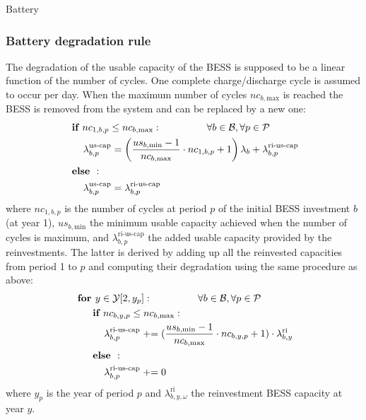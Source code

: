 \begin{frame}[allowframebreaks]{Battery}
\subsubsection{Battery degradation rule}
The degradation of the usable capacity of the BESS is supposed to be a linear function of the number of cycles. 
One complete charge/discharge cycle is assumed to occur per day. When the maximum number of cycles $nc_{b,\text{max}}$ is reached the BESS is removed from the system and can be replaced by a new one:
\begin{align}
 &\textbf{~if~} nc_{1, b, p} \leq nc_{b,\text{max}}: \textbf{~~~~~~~~~~~~}\forall  b \in \mathcal{B}, \forall  p \in \mathcal{P} \notag\\
     &\textbf{~~~~}\lambda^\text{us-cap}_{b,p} = \left(\frac{us_{b,\text{min}} - 1}{nc_{b,\text{max}}} \cdot nc_{1, b, p} + 1\right)  \lambda_b + \lambda^\text{ri-us-cap}_{b,p} \\
&\textbf{~else~}: \notag \\
    &\textbf{~~~~} \lambda^\text{us-cap}_{b,p} = \lambda^\text{ri-us-cap}_{b,p}
\end{align}
where $nc_{1, b, p}$ is the number of cycles at period $p$ of the initial BESS investment $b$ (at year 1), $us_{b,\text{min}}$ the minimum usable capacity achieved when the number of cycles is maximum, and $\lambda^\text{ri-us-cap}_{b,p}$ the added usable capacity provided by the reinvestments.
The latter is derived by adding up all the reinvested capacities from period 1 to $p$ and computing their degradation using the same procedure as above:
\begin{align}
 &\textbf{~for~} y \in \mathcal{Y}[2, y_p]: \textbf{~~~~~~~~~~~~}\forall  b \in \mathcal{B}, \forall  p \in \mathcal{P} \notag\\ 
 &\textbf{~~~~}\textbf{~if~} nc_{b,y, p} \leq nc_{b,\text{max}}: \notag\\
     &\textbf{~~~~~~~~}\lambda^\text{ri-us-cap}_{b,p} \mathrel{+}= (\frac{us_{b,\text{min}} - 1}{nc_{b,\text{max}}} \cdot nc_{b, y, p} + 1) \cdot \lambda_{b,y}^{\text{ri}}  \\
&\textbf{~~~~~else~}: \notag \\
    &\textbf{~~~~~~~~} \lambda^\text{ri-us-cap}_{b,p} \mathrel{+}= 0
\end{align}
where $y_p$ is the year of period $p$ and $\lambda_{b,y,\omega}^{\text{ri}}$ the reinvestment BESS capacity at year $y$.
\end{frame}



